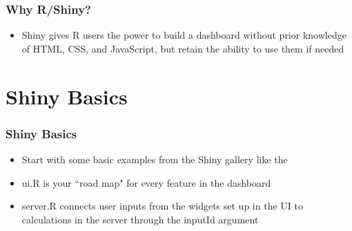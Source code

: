 \documentclass[
	11pt, %
]{beamer}
\begin{document}
\begin{frame}
	\frametitle{Why R/Shiny?}
	
	\begin{itemize}
		\item Shiny gives R users the power to build a dashboard without prior knowledge of HTML, CSS, and JavaScript, but retain the ability to use them if needed
	\end{itemize}
	
	
\end{frame}


\section{Shiny Basics}

\begin{frame}
	\frametitle{Shiny Basics}
	
	\begin{itemize}
		\item Start with some basic examples from the Shiny gallery like the \href{https://shiny.rstudio.com/gallery/telephones-by-region.html}{\color{blue}{telephones by region dashboard}}
		\item ui.R is your ``road map" for every feature in the dashboard
		\item server.R connects user inputs from the widgets set up in the UI to calculations in the server through the inputId argument
	\end{itemize}
	
	
\end{frame}
\end{document}

